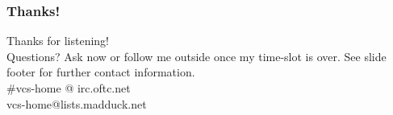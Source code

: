 \documentclass[t]{beamer}
\begin{document}
\begin{frame}
	\frametitle{Thanks!}
		\begin{center}
			\vfill
			Thanks for listening!\\
			\vfill
			Questions? Ask now or follow me outside once my time-slot is over.
			\vfill
			See slide footer for further contact information.\\
			\vfill
			\#vcs-home @ irc.oftc.net\\
			vcs-home@lists.madduck.net
			\vfill
		\end{center}
\end{frame}
\end{document}
